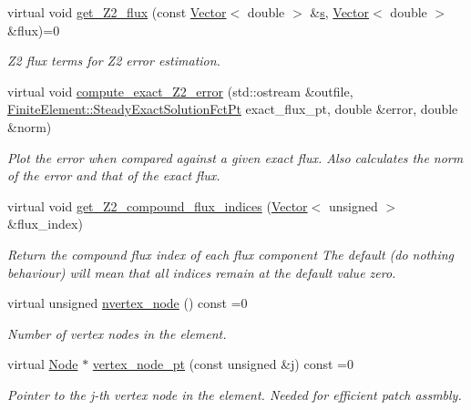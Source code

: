 \begin{DoxyCompactItemize}
virtual void \hyperlink{classoomph_1_1ElementWithZ2ErrorEstimator_a5688ff5f546d81771cabad82ca5a7556}{get\+\_\+\+Z2\+\_\+flux} (const \hyperlink{classoomph_1_1Vector}{Vector}$<$ double $>$ \&\hyperlink{cfortran_8h_ab7123126e4885ef647dd9c6e3807a21c}{s}, \hyperlink{classoomph_1_1Vector}{Vector}$<$ double $>$ \&flux)=0
\begin{DoxyCompactList}\small\item\em Z2 \textquotesingle{}flux\textquotesingle{} terms for Z2 error estimation. \end{DoxyCompactList}\item 
virtual void \hyperlink{classoomph_1_1ElementWithZ2ErrorEstimator_a8632b99123982c3dd8b26a5eeea6dc20}{compute\+\_\+exact\+\_\+\+Z2\+\_\+error} (std\+::ostream \&outfile, \hyperlink{classoomph_1_1FiniteElement_a690fd33af26cc3e84f39bba6d5a85202}{Finite\+Element\+::\+Steady\+Exact\+Solution\+Fct\+Pt} exact\+\_\+flux\+\_\+pt, double \&error, double \&norm)
\begin{DoxyCompactList}\small\item\em Plot the error when compared against a given exact flux. Also calculates the norm of the error and that of the exact flux. \end{DoxyCompactList}\item 
virtual void \hyperlink{classoomph_1_1ElementWithZ2ErrorEstimator_a2d894f4d55c63e77bd9f3420ccf9d315}{get\+\_\+\+Z2\+\_\+compound\+\_\+flux\+\_\+indices} (\hyperlink{classoomph_1_1Vector}{Vector}$<$ unsigned $>$ \&flux\+\_\+index)
\begin{DoxyCompactList}\small\item\em Return the compound flux index of each flux component The default (do nothing behaviour) will mean that all indices remain at the default value zero. \end{DoxyCompactList}\item 
virtual unsigned \hyperlink{classoomph_1_1ElementWithZ2ErrorEstimator_a19495a0e77ef4ff35f15fdf7913b4077}{nvertex\+\_\+node} () const =0
\begin{DoxyCompactList}\small\item\em Number of vertex nodes in the element. \end{DoxyCompactList}\item 
virtual \hyperlink{classoomph_1_1Node}{Node} $\ast$ \hyperlink{classoomph_1_1ElementWithZ2ErrorEstimator_a0eedccc33519f852c5dc2055ddf2774b}{vertex\+\_\+node\+\_\+pt} (const unsigned \&j) const =0
\begin{DoxyCompactList}\small\item\em Pointer to the j-\/th vertex node in the element. Needed for efficient patch assmbly. \end{DoxyCompactList}\item 

\end{DoxyCompactItemize}
